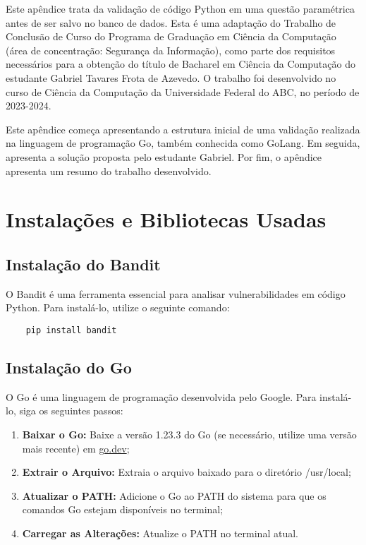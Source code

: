 \label{ch:apendiceD}

Este apêndice trata da validação de código Python em uma questão paramétrica antes de ser salvo no banco de dados. Esta é uma adaptação do Trabalho de Conclusão de Curso do Programa de Graduação em Ciência da Computação (área de concentração: Segurança da Informação), como parte dos requisitos necessários para a obtenção do título de Bacharel em Ciência da Computação do estudante Gabriel Tavares Frota de Azevedo. O trabalho foi desenvolvido no curso de Ciência da Computação da Universidade Federal do ABC, no período de 2023-2024. 

Este apêndice começa apresentando a estrutura inicial de uma validação realizada na linguagem de programação Go, também conhecida como GoLang. Em seguida, apresenta a solução proposta pelo estudante Gabriel. Por fim, o apêndice apresenta um resumo do trabalho desenvolvido.


\section{Instalações e Bibliotecas Usadas}

\subsection{Instalação do Bandit}
O Bandit é uma ferramenta essencial para analisar vulnerabilidades em código Python. Para instalá-lo, utilize o seguinte comando:

\begin{verbatim}
    pip install bandit
\end{verbatim}

\subsection{Instalação do Go}
O Go é uma linguagem de programação desenvolvida pelo Google. Para instalá-lo, siga os seguintes passos:

\begin{enumerate}
    \item \textbf{Baixar o Go:} Baixe a versão 1.23.3 do Go (se necessário, utilize uma versão mais recente) em \href{https://go.dev/doc/install}{go.dev};
    \item \textbf{Extrair o Arquivo:} Extraia o arquivo baixado para o diretório /usr/local;
    \item \textbf{Atualizar o PATH:} Adicione o Go ao PATH do sistema para que os comandos Go estejam disponíveis no terminal;
    \item \textbf{Carregar as Alterações:} Atualize o PATH no terminal atual.
\end{enumerate}

